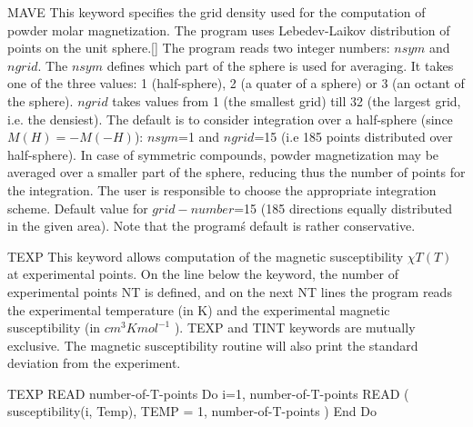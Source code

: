 \begin{keywordlist}
\item[MAVE]
This keyword specifies the grid density used for the computation of powder molar
magnetization. The program uses Lebedev-Laikov distribution of points on the unit sphere.[]
The program reads two integer numbers: $nsym$ and $ngrid$. The $nsym$ defines which
part of the sphere is used for averaging. It takes one of the three values: 1 (half-sphere),
2 (a quater of a sphere) or 3 (an octant of the sphere). $ngrid$ takes values from 1
(the smallest grid) till 32 (the largest grid, i.e. the densiest). The default is to
consider integration over a half-sphere (since $M(H)=-M(-H)$): $nsym$=1 and $ngrid$=15
(i.e 185 points distributed over half-sphere). In case of symmetric compounds, powder
magnetization may be averaged over a smaller part of the sphere, reducing thus the number
of points for the integration. The user is responsible to choose the appropriate integration scheme.
Default value for $grid-number$=15 (185 directions equally distributed in the given area).
Note that the program\'s default is rather conservative.


\item[TEXP]
This keyword allows computation of the magnetic susceptibility $\chi T(T)$ at experimental points.
On the line below the keyword, the number of experimental points NT is defined, and on the next NT lines the program reads the experimental temperature (in K) and the experimental magnetic susceptibility (in $cm^3Kmol^{-1}$ ). TEXP and TINT keywords are mutually exclusive. The magnetic susceptibility routine will also print the standard deviation from the experiment.
\begin{sourcelisting}
TEXP
   READ  number-of-T-points
   Do i=1, number-of-T-points
      READ ( susceptibility(i, Temp), TEMP = 1, number-of-T-points )
   End Do
\end{sourcelisting}
%






\end{keywordlist}
